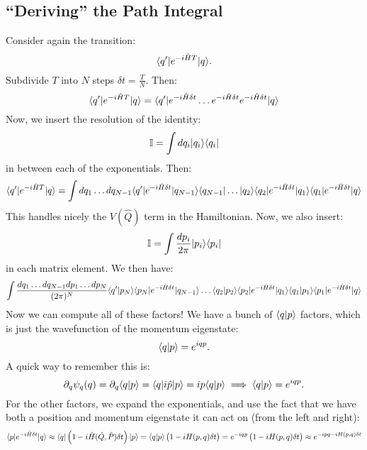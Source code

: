 \subsection{``Deriving'' the Path Integral}
Consider again the transition:
\begin{equation}
    \langle q' \rvert e^{-i\hat{H}T}\lvert q \rangle.
\end{equation}
Subdivide $T$ into $N$ steps $\delta t = \frac{T}{N}$. Then:
\begin{equation}
    \langle q' \rvert e^{-i\hat{H}T}\lvert q \rangle = \langle q' \rvert e^{-i\hat{H}\delta t} \ldots e^{-i\hat{H}\delta t} e^{-i\hat{H}\delta t}\lvert q \rangle
\end{equation}
Now, we insert the resolution of the identity:
\begin{equation}
    \mathbb{I} = \int dq_i \lvert q_i \rangle \langle q_i \rvert
\end{equation}
in between each of the exponentials. Then:
\begin{equation}
    \langle q' \rvert e^{-i\hat{H}T}\lvert q \rangle = \int dq_1 \ldots dq_{N-1}\langle q' \rvert e^{-i\hat{H}\delta t}\lvert q_{N-1} \rangle\langle q_{N-1} \rvert\ldots \lvert q_2 \rangle\langle q_2 \rvert e^{-i\hat{H} \delta t}\lvert q_1 \rangle\langle q_1 \rvert e^{-i\hat{H} \delta t}\lvert q \rangle
\end{equation}
This handles nicely the $V(\hat{Q})$ term in the Hamiltonian. Now, we also insert:
\begin{equation}
    \mathbb{I} = \int \frac{dp_i}{2\pi} \lvert p_i \rangle \langle p_i \rvert
\end{equation}
in each matrix element. We then have:
\begin{equation}
    \int \frac{dq_1 \ldots dq_{N-1}dp_1 \ldots dp_N}{(2\pi)^N} \langle q' \lvert p_N \rangle \langle p_N \rvert e^{-i\hat{H} \delta t}\lvert q_{N-1} \rangle\ldots \langle q_2 \lvert p_2 \rangle\langle p_2 \rvert e^{-i\hat{H} \delta t}\lvert q_1 \rangle\langle q_1 \lvert p_1 \rangle\langle p_1 \rvert e^{-i\hat{H} \delta t}\lvert q \rangle
\end{equation}
Now we can compute all of these factors! We have a bunch of $\langle q \lvert p \rangle$ factors, which is just the wavefunction of the momentum eigenstate:
\begin{equation}
    \langle q \lvert p \rangle = e^{iqp}.
\end{equation}
A quick way to remember this is:
\begin{equation}
    \partial_q \psi_q(q) = \partial_q\langle q \lvert p \rangle = \langle q \rvert i\hat{p}\lvert p \rangle = ip\langle q \lvert p \rangle \implies \langle q \lvert p \rangle = e^{iqp}.
\end{equation}
For the other factors, we expand the exponentials, and use the fact that we have both a position and momentum eigenstate it can act on (from the left and right):
\begin{equation}
    \langle p \rvert e^{-i\hat{H}\delta t}\lvert q \rangle \approx \langle q \rvert\left(1 - i\hat{H}(\hat{Q}, \hat{P})\delta t\right)\lvert p \rangle = \langle q \lvert p \rangle\left(1 - iH(p, q)\delta t\right) = e^{-iqp}\left(1 - iH(p, q)\delta t\right) \approx e^{-ipq - iH(p, q)\delta t}
\end{equation}
